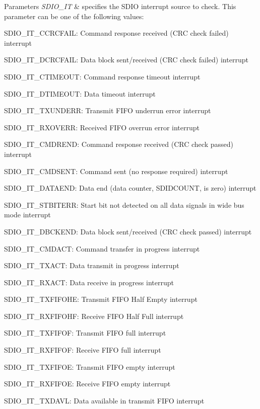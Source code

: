 \begin{DoxyParams}{Parameters}
{\em S\+D\+I\+O\+\_\+\+IT} & specifies the S\+D\+IO interrupt source to check. This parameter can be one of the following values\+: \begin{DoxyItemize}
\item S\+D\+I\+O\+\_\+\+I\+T\+\_\+\+C\+C\+R\+C\+F\+A\+IL\+: Command response received (C\+RC check failed) interrupt \item S\+D\+I\+O\+\_\+\+I\+T\+\_\+\+D\+C\+R\+C\+F\+A\+IL\+: Data block sent/received (C\+RC check failed) interrupt \item S\+D\+I\+O\+\_\+\+I\+T\+\_\+\+C\+T\+I\+M\+E\+O\+UT\+: Command response timeout interrupt \item S\+D\+I\+O\+\_\+\+I\+T\+\_\+\+D\+T\+I\+M\+E\+O\+UT\+: Data timeout interrupt \item S\+D\+I\+O\+\_\+\+I\+T\+\_\+\+T\+X\+U\+N\+D\+E\+RR\+: Transmit F\+I\+FO underrun error interrupt \item S\+D\+I\+O\+\_\+\+I\+T\+\_\+\+R\+X\+O\+V\+E\+RR\+: Received F\+I\+FO overrun error interrupt \item S\+D\+I\+O\+\_\+\+I\+T\+\_\+\+C\+M\+D\+R\+E\+ND\+: Command response received (C\+RC check passed) interrupt \item S\+D\+I\+O\+\_\+\+I\+T\+\_\+\+C\+M\+D\+S\+E\+NT\+: Command sent (no response required) interrupt \item S\+D\+I\+O\+\_\+\+I\+T\+\_\+\+D\+A\+T\+A\+E\+ND\+: Data end (data counter, S\+D\+I\+D\+C\+O\+U\+NT, is zero) interrupt \item S\+D\+I\+O\+\_\+\+I\+T\+\_\+\+S\+T\+B\+I\+T\+E\+RR\+: Start bit not detected on all data signals in wide bus mode interrupt \item S\+D\+I\+O\+\_\+\+I\+T\+\_\+\+D\+B\+C\+K\+E\+ND\+: Data block sent/received (C\+RC check passed) interrupt \item S\+D\+I\+O\+\_\+\+I\+T\+\_\+\+C\+M\+D\+A\+CT\+: Command transfer in progress interrupt \item S\+D\+I\+O\+\_\+\+I\+T\+\_\+\+T\+X\+A\+CT\+: Data transmit in progress interrupt \item S\+D\+I\+O\+\_\+\+I\+T\+\_\+\+R\+X\+A\+CT\+: Data receive in progress interrupt \item S\+D\+I\+O\+\_\+\+I\+T\+\_\+\+T\+X\+F\+I\+F\+O\+HE\+: Transmit F\+I\+FO Half Empty interrupt \item S\+D\+I\+O\+\_\+\+I\+T\+\_\+\+R\+X\+F\+I\+F\+O\+HF\+: Receive F\+I\+FO Half Full interrupt \item S\+D\+I\+O\+\_\+\+I\+T\+\_\+\+T\+X\+F\+I\+F\+OF\+: Transmit F\+I\+FO full interrupt \item S\+D\+I\+O\+\_\+\+I\+T\+\_\+\+R\+X\+F\+I\+F\+OF\+: Receive F\+I\+FO full interrupt \item S\+D\+I\+O\+\_\+\+I\+T\+\_\+\+T\+X\+F\+I\+F\+OE\+: Transmit F\+I\+FO empty interrupt \item S\+D\+I\+O\+\_\+\+I\+T\+\_\+\+R\+X\+F\+I\+F\+OE\+: Receive F\+I\+FO empty interrupt \item S\+D\+I\+O\+\_\+\+I\+T\+\_\+\+T\+X\+D\+A\+VL\+: Data available in transmit F\+I\+FO interrupt \item 
\end{DoxyItemize}
\end{DoxyParams}

